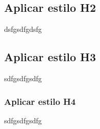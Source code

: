 \documentclass[10.5pt,a4paper]{article}
\begin{document}
\coveramz

\newpage

\secondpageamz

\newpage



\setcounter{page}{1}



\textcolor{verde_amz2030}{\section{Aplicar estilo H2}}
dsfgsdfgdsfg
\textcolor{verde_amz2030}{\subsection{Aplicar estilo H3}}
sdfgsdfgsdfg
\subsubsection{Aplicar estilo H4}
sdfgsdfgsdfg


\newpage

\finalpageamz
\end{document}
